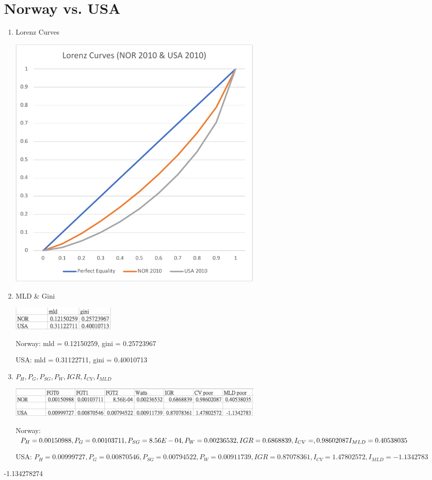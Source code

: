 \documentclass{article}[13pt]
\begin{document}
\newpage


\section{Norway vs. USA}

\begin{enumerate}
    \item{Lorenz Curves}
    
    \includegraphics[width=5in]{nor_usa_lorenz.pdf}

    \item{MLD \& Gini}
    
    \includegraphics[width=2in]{nor_usa_2.png}

    Norway: mld = 0.12150259, gini = 0.25723967

    USA: mld = 0.31122711, gini = 0.40010713

    \item{$P_H, P_G, P_{SG}, P_W, IGR, I_{CV}, I_{MLD}$}

    \includegraphics[width=5in]{nor_usa_1.png}

    Norway: $P_H = 0.00150988, P_G = 0.00103711, P_{SG} = 8.56E-04, P_W = 0.00236532, \newline IGR = 0.6868839, I_{CV} = ,0.98602087 I_{MLD} = 0.40538035$

    USA: $P_H = 0.00999727, P_G = 0.00870546, P_{SG} = 0.00794522, P_W = 0.00911739, IGR = 0.87078361, I_{CV} = 1.47802572, I_{MLD} = -1.1342783$

\end{enumerate}
-1.134278274
\end{document}
